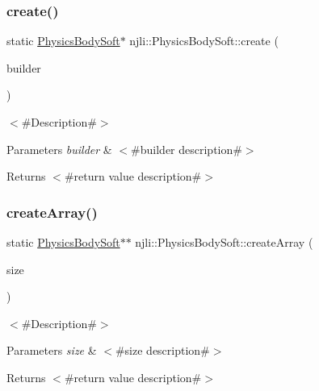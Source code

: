 \subsubsection{\texorpdfstring{create()}{create()}\hspace{0.1cm}{\footnotesize\ttfamily [2/2]}}
{\footnotesize\ttfamily static \mbox{\hyperlink{classnjli_1_1_physics_body_soft}{Physics\+Body\+Soft}}$\ast$ njli\+::\+Physics\+Body\+Soft\+::create (\begin{DoxyParamCaption}\item[{const \mbox{\hyperlink{classnjli_1_1_physics_body_soft_builder}{Physics\+Body\+Soft\+Builder}} \&}]{builder }\end{DoxyParamCaption})\hspace{0.3cm}{\ttfamily [static]}}

$<$\#\+Description\#$>$


\begin{DoxyParams}{Parameters}
{\em builder} & $<$\#builder description\#$>$\\
\hline
\end{DoxyParams}
\begin{DoxyReturn}{Returns}
$<$\#return value description\#$>$ 
\end{DoxyReturn}
\mbox{\label{classnjli_1_1_physics_body_soft_ac66deabb8649d1292091ac38ffe7b754}} 
\subsubsection{\texorpdfstring{create\+Array()}{createArray()}}
{\footnotesize\ttfamily static \mbox{\hyperlink{classnjli_1_1_physics_body_soft}{Physics\+Body\+Soft}}$\ast$$\ast$ njli\+::\+Physics\+Body\+Soft\+::create\+Array (\begin{DoxyParamCaption}\item[{const \mbox{\hyperlink{_util_8h_a10e94b422ef0c20dcdec20d31a1f5049}{u32}}}]{size }\end{DoxyParamCaption})\hspace{0.3cm}{\ttfamily [static]}}

$<$\#\+Description\#$>$


\begin{DoxyParams}{Parameters}
{\em size} & $<$\#size description\#$>$\\
\hline
\end{DoxyParams}
\begin{DoxyReturn}{Returns}
$<$\#return value description\#$>$ 
\end{DoxyReturn}
\mbox{\label{classnjli_1_1_physics_body_soft_a5a41905cf8b3016cf9adfd19a1b0f827}} 
